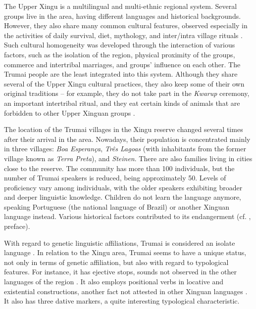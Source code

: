 \documentclass[output=paper,
modfonts,nonflat
]{langsci/langscibook}
\begin{document}
The Upper Xingu is a multilingual and multi-ethnic regional system. Several groups live in the area, having different languages and historical backgrounds. However, they also share many common cultural features, observed especially in the activities of daily survival, diet, mythology, and inter/intra village rituals \citep{GalvãoSimões1966}. Such cultural homogeneity was developed through the interaction of various factors, such as the isolation of the region, physical proximity of the groups, commerce and intertribal marriages, and groups' influence on each other. The Trumai people are the least integrated into this system. Although they share several of the Upper Xingu cultural practices, they also keep some of their own original traditions – for example,  they do not take part in the \textit{Kwarup} ceremony, an important intertribal ritual, and they eat certain kinds of animals that are forbidden to other Upper Xinguan groups \citep{Monod-Becquelin1975,Monod-Becquelin2001}.

The location of the Trumai villages in the Xingu reserve changed several times after their arrival in the area. Nowadays, their population is concentrated mainly in three villages: \textit{Boa Esperança}, \textit{Três Lagoas} (with inhabitants from the former village known as \textit{Terra Preta}), and \textit{Steinen}. There are also families living in cities close to the reserve. The community has more than 100 individuals, but the number of Trumai speakers is reduced, being approximately 50. Levels of proficiency vary among individuals, with the older speakers exhibiting broader and deeper linguistic knowledge. Children do not learn the language anymore, speaking Portuguese (the national language of Brazil) or another Xinguan language instead. Various historical factors contributed to its endangerment (cf. \citealt{Guirardello1999}, preface).

With regard to genetic linguistic affiliations, Trumai is considered an isolate language \citep{Rodrigues1986,Kaufman1994}. In relation to the Xingu area, Trumai seems to have a unique status, not only in terms of genetic affiliation, but also with regard to typological features. For instance, it has ejective stops, sounds not observed in the other languages of the region \citep{Seki2000,Fargetti1992,Dourado2001,Emmerich1980}. It also employs positional verbs in locative and existential constructions, another fact not attested in other Xinguan languages \citep{Guirardello2007}. It also has three dative markers, a quite interesting typological characteristic.
\end{document}
